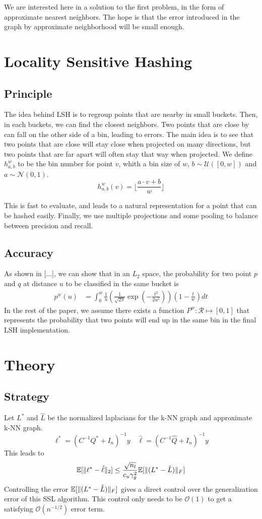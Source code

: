 \documentclass{article} %
\begin{document}
We are interested here in a solution to the first problem, in the form of approximate nearest neighbors. The hope is that the error introduced in the graph by approximate neighborhood will be small enough.


\section{Locality Sensitive Hashing}
\subsection{Principle}
The idea behind LSH is to regroup points that are nearby in small buckets. Then, in each buckets, we can find the closest neighbors. Two points that are close by can fall on the other side of a bin, leading to errors. The main idea is to see that two points that are close will stay close when projected on many directions, but two points that are far apart will often stay that way when projected. We define $h^w_{a,b}$ to be the bin number for point $v$, whith a bin size of $w$, $b \sim \mathcal{U}([0,w])$ and $a \sim \mathcal{N}(0,1)$.
$$h_{a,b}^w(v) = \lfloor \frac{ a \cdot v + b}{w} \rfloor$$

This is fast to evaluate, and leads to a natural representation for a point that can be hashed easily. Finally, we use multiple projections and some pooling to balance between precision and recall.

\subsection{Accuracy}
As shown in [...], we can show that in an $L_2$ space, the probability for two point $p$ and $q$ at distance $u$ to be classified in the same bucket is 
\begin{align*}
  p^w(u) &= \int_0^w \frac{1}{u}\left( \frac{1}{\sqrt{2\pi}}\exp(-\frac{t^2}{2u^2})\right)\left(1-\frac{t}{w}\right)dt
\end{align*}
In the rest of the paper, we assume there exists a function $P^w:\mathcal{R}\mapsto [0,1]$ that represents the probability that two points will end up in the same bin in the final LSH implementation.

\section{Theory}
\subsection{Strategy}
Let $L^*$ and $\hat{L}$ be the normalized laplacians for the k-NN graph and approximate k-NN graph.
$$\ell^* = (C^{-1}Q^* + I_n)^{-1}y \quad \hat{\ell} = (C^{-1}\hat{Q} + I_n)^{-1}y$$
This leads to 
$$ \mathbb{E}[\Arrowvert\ell^*-\hat{\ell}\Arrowvert_2] \leq \frac{\sqrt{n_l}}{c_u\gamma_g^2}\mathbb{E}[\Arrowvert(L^*-\hat{L})\Arrowvert_F]$$
Controlling the error $\mathbb{E}[\Arrowvert(L^*-\hat{L})\Arrowvert_F]$ gives a direct control over the generalization error of this SSL algorithm. This control only needs to be $\mathcal{O}(1)$ to get a satisfying $\mathcal{O}(n^{-1/2})$ error term.
\end{document}
